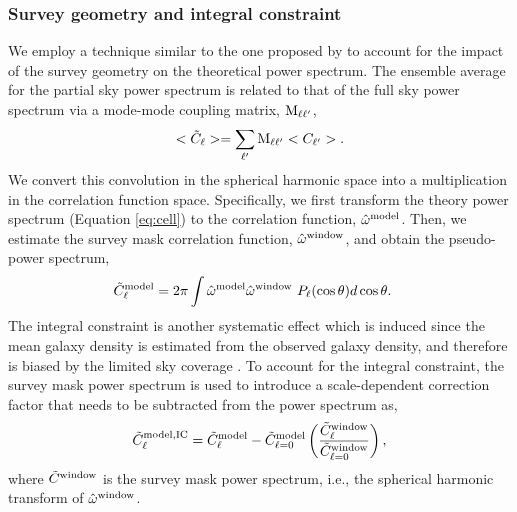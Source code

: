 \subsubsection{Survey geometry and integral constraint}
We employ a technique similar to the one proposed by \cite{chon2004fast} to account for the impact of the survey geometry on the theoretical power spectrum. The ensemble average for the partial sky power spectrum is related to that of the full sky power spectrum via a mode-mode coupling matrix, ${\rm M}_{\ell \ell^{\prime}}$,
\begin{equation}\label{eq:mixm}
    <\tilde{C}_{\ell}> = \sum_{\ell^{\prime}} {\rm M}_{\ell \ell^{\prime}}<C_{\ell^{\prime}}>.
\end{equation}
We convert this convolution in the spherical harmonic space into a multiplication in the correlation function space. Specifically, we first transform the theory power spectrum (Equation \ref{eq:cell}) to the correlation function, $\hat{\omega}^{\rm model}$. Then, we estimate the survey mask correlation function, $\hat{\omega}^{\rm window}$, and obtain the pseudo-power spectrum,
\begin{align}
    \tilde{C}^{\rm model}_{\ell} &= 2\pi \int \hat{\omega}^{\rm model}\hat{\omega}^{\rm window}~P_{\ell}(\cos\theta) d\cos\theta.
\end{align}
 The integral constraint is another systematic effect which is induced since the mean galaxy density is estimated from the observed galaxy density, and therefore is biased by the limited sky coverage \citep{peacock1991large}. To account for the integral constraint, the survey mask power spectrum is used to introduce a scale-dependent correction factor that needs to be subtracted from the power spectrum as,
\begin{equation}
     \tilde{C}^{\rm model, IC}_{\ell} = \tilde{C}^{\rm model}_{\ell} - \tilde{C}^{\rm model}_{\ell=0} \left(\frac{\tilde{C}^{\rm window}_{\ell}}{\tilde{C}^{\rm window}_{\ell=0}}\right),
\end{equation}
where $\tilde{C}^{\rm window}$ is the survey mask power spectrum, i.e., the spherical harmonic transform of $\hat{\omega}^{\rm window}$.

